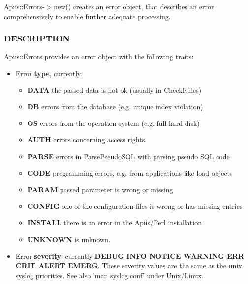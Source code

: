 Apiis::Errors-$>$new() creates an error object, that describes an error
comprehensively to enable further adequate processing.

\subsubsection*{DESCRIPTION\label{Apiis::Errors_--_Provide_error_objects_for_generic_error_handling_in_APIIS_DESCRIPTION}}


Apiis::Errors provides an error object with the following traits:

\begin{itemize}

\item Error \textbf{type}, currently:\begin{itemize}

\item \textbf{DATA}    the passed data is not ok (usually in CheckRules)
\item \textbf{DB}      errors from the database (e.g. unique index violation)
\item \textbf{OS}      errors from the operation system (e.g. full hard disk)
\item \textbf{AUTH}    errors concerning access rights
\item \textbf{PARSE}   errors in ParsePseudoSQL with parsing pseudo SQL code
\item \textbf{CODE}    programming errors, e.g. from applications like load objects
\item \textbf{PARAM}   passed parameter is wrong or missing
\item \textbf{CONFIG}  one of the configuration files is wrong or has missing entries
\item \textbf{INSTALL} there is an error in the Apiis/Perl installation
\item \textbf{UNKNOWN} is unknown.\end{itemize}

\item Error \textbf{severity}, currently \textbf{DEBUG INFO NOTICE WARNING ERR CRIT
ALERT EMERG}. These severity values are the same as the unix syslog
priorities. See also 'man syslog.conf' under Unix/Linux.\begin{itemize}


\end{itemize}
\end{itemize}

